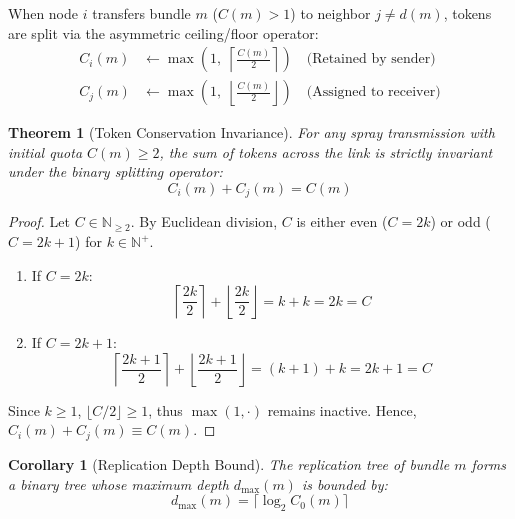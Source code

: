 \documentclass[journal,compsoc]{IEEEtran}
\newtheorem{theorem}{Theorem}
\newtheorem{corollary}{Corollary}
\begin{document}
When node $i$ transfers bundle $m$ ($C(m) > 1$) to neighbor $j \ne d(m)$, tokens are split via the asymmetric ceiling/floor operator:
\begin{align}
C_i(m) &\leftarrow \max\left(1, \; \left\lceil \frac{C(m)}{2} \right\rceil\right) \quad \text{(Retained by sender)} \label{eq:binary_sender} \\
C_j(m) &\leftarrow \max\left(1, \; \left\lfloor \frac{C(m)}{2} \right\rfloor\right) \quad \text{(Assigned to receiver)} \label{eq:binary_receiver}
\end{align}

\begin{theorem}[Token Conservation Invariance]
\label{thm:token_conservation}
For any spray transmission with initial quota $C(m) \ge 2$, the sum of tokens across the link is strictly invariant under the binary splitting operator:
\begin{equation}
C_i(m) + C_j(m) = C(m)
\end{equation}
\end{theorem}

\begin{proof}
Let $C \in \mathbb{N}_{\ge 2}$. By Euclidean division, $C$ is either even ($C = 2k$) or odd ($C = 2k + 1$) for $k \in \mathbb{N}^+$.
\begin{enumerate}
\item If $C = 2k$:
\begin{equation*}
\left\lceil \frac{2k}{2} \right\rceil + \left\lfloor \frac{2k}{2} \right\rfloor = k + k = 2k = C
\end{equation*}
\item If $C = 2k + 1$:
\begin{equation*}
\left\lceil \frac{2k + 1}{2} \right\rceil + \left\lfloor \frac{2k + 1}{2} \right\rfloor = (k + 1) + k = 2k + 1 = C
\end{equation*}
\end{enumerate}
Since $k \ge 1$, $\lfloor C/2 \rfloor \ge 1$, thus $\max(1, \cdot)$ remains inactive. Hence, $C_i(m) + C_j(m) \equiv C(m)$.
\end{proof}

\begin{corollary}[Replication Depth Bound]
The replication tree of bundle $m$ forms a binary tree whose maximum depth $d_{\max}(m)$ is bounded by:
\begin{equation}
d_{\max}(m) = \lceil \log_2 C_0(m) \rceil
\end{equation}
\end{corollary}
\end{document}
